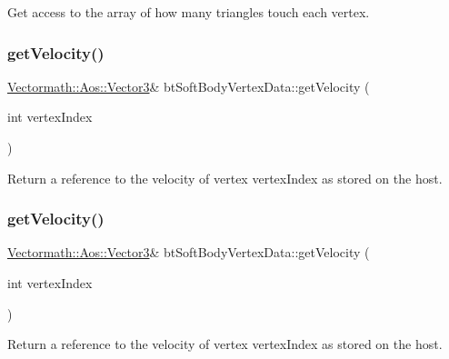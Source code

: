 Get access to the array of how many triangles touch each vertex. \mbox{\label{classbtSoftBodyVertexData_ae2283fd9cc23dcaff3721fbcf26e3bad}} 
\subsubsection{\texorpdfstring{get\+Velocity()}{getVelocity()}\hspace{0.1cm}{\footnotesize\ttfamily [1/2]}}
{\footnotesize\ttfamily \hyperlink{classVectormath_1_1Aos_1_1Vector3}{Vectormath\+::\+Aos\+::\+Vector3}\& bt\+Soft\+Body\+Vertex\+Data\+::get\+Velocity (\begin{DoxyParamCaption}\item[{int}]{vertex\+Index }\end{DoxyParamCaption})\hspace{0.3cm}{\ttfamily [inline]}}

Return a reference to the velocity of vertex vertex\+Index as stored on the host. \mbox{\label{classbtSoftBodyVertexData_ae2283fd9cc23dcaff3721fbcf26e3bad}} 
\subsubsection{\texorpdfstring{get\+Velocity()}{getVelocity()}\hspace{0.1cm}{\footnotesize\ttfamily [2/2]}}
{\footnotesize\ttfamily \hyperlink{classVectormath_1_1Aos_1_1Vector3}{Vectormath\+::\+Aos\+::\+Vector3}\& bt\+Soft\+Body\+Vertex\+Data\+::get\+Velocity (\begin{DoxyParamCaption}\item[{int}]{vertex\+Index }\end{DoxyParamCaption})\hspace{0.3cm}{\ttfamily [inline]}}

Return a reference to the velocity of vertex vertex\+Index as stored on the host. \mbox{\label{classbtSoftBodyVertexData_aaa8ab4065ecf47a9c3b946b67b6c9f1b}} 
